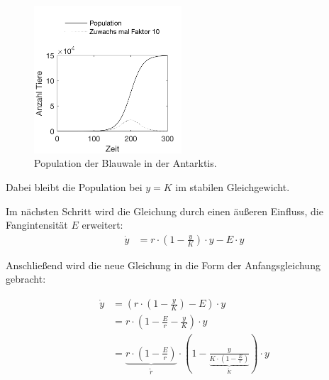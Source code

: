 \documentclass[a4paper,twoside]{article}
\begin{document}
	\begin{figure}[!h]
  		\centering
 		\includegraphics[width=5.5cm]{Diagramme/wachstum_ohne_einfluesse.png}
  		\caption{Population der Blauwale in der Antarktis.}
  		\label{fig:wachstum_ohne_einfluesse}
	\end{figure}

	Dabei bleibt die Population bei \(y = K\) im stabilen Gleichgewicht.

	Im nächsten Schritt wird die Gleichung durch einen äußeren Einfluss, die Fangintensität \(E\) erweitert:
	\begin{align*}
		\dot{y} &= r \cdot\left(1-\frac{y}{K}\right) \cdot y - E \cdot y
	\end{align*}	
	
	\newpage	
	
	Anschließend wird die neue Gleichung in die Form der Anfangsgleichung gebracht:
		
	\begin{align*}
		\dot{y} &= \left( r \cdot\left(1 - \frac{y}{K}\right) - E\right) \cdot y \\
		&= r \cdot \left( 1 - \frac{E}{r} - \frac{y}{K} \right) \cdot y \\
		&= \underbrace{r \cdot \left( 1 - \frac{E}{r} \right)}_{\tilde{r}} \cdot \left( 1 - \frac{y}{\underbrace{K \cdot \left(1 - \frac{E}{r}\right)}_{\tilde{K}}} \right) \cdot y
	\end{align*}
	
\end{document}
